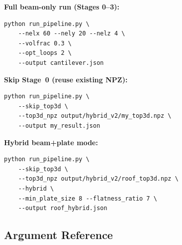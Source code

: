 \documentclass[a4paper, 11pt, openany]{report}
\begin{document}
\textbf{Full beam-only run (Stages 0--3):}
\begin{lstlisting}[style=bashstyle]
python run_pipeline.py \
    --nelx 60 --nely 20 --nelz 4 \
    --volfrac 0.3 \
    --opt_loops 2 \
    --output cantilever.json
\end{lstlisting}

\textbf{Skip Stage~0 (reuse existing NPZ):}
\begin{lstlisting}[style=bashstyle]
python run_pipeline.py \
    --skip_top3d \
    --top3d_npz output/hybrid_v2/my_top3d.npz \
    --output my_result.json
\end{lstlisting}

\textbf{Hybrid beam+plate mode:}
\begin{lstlisting}[style=bashstyle]
python run_pipeline.py \
    --skip_top3d \
    --top3d_npz output/hybrid_v2/roof_top3d.npz \
    --hybrid \
    --min_plate_size 8 --flatness_ratio 7 \
    --output roof_hybrid.json
\end{lstlisting}


\subsection{Argument Reference}
\end{document}
